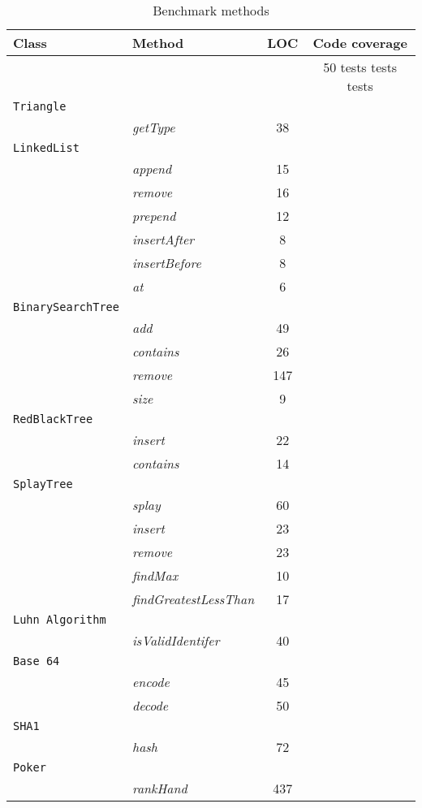 \begin{table}[h]
\centering
\begin{tabular}{|l|l|c|c|}
\hline
\textbf{Class} & \textbf{Method} & \textbf{LOC} & \textbf{Code coverage} \\
\hline
 & & & 50 tests \vline 100 tests \vline 1000 tests \\
\hline
\texttt{Triangle} & & \\
           & \textit{getType} & 38      \\
\hline
\texttt{LinkedList} & & \\
           & \textit{append} & 15       \\
           & \textit{remove} & 16       \\
           & \textit{prepend} & 12      \\
           & \textit{insertAfter} & 8   \\
           & \textit{insertBefore} & 8  \\
           & \textit{at} & 6            \\
\hline
\texttt{BinarySearchTree} & &     \\
           & \emph{add} & 49      \\
           & \emph{contains} & 26 \\
           & \emph{remove} & 147  \\
           & \emph{size} & 9      \\
\hline
\texttt{RedBlackTree} & &         \\
           & \emph{insert} & 22   \\
           & \emph{contains} & 14 \\
\hline
\texttt{SplayTree} & &             \\
           & \emph{splay} & 60 \\
           & \emph{insert} & 23 \\
           & \emph{remove} & 23 \\
           & \emph{findMax} & 10 \\
           & \emph{findGreatestLessThan} & 17 \\
\hline
\texttt{Luhn Algorithm} & &     \\
           & \emph{isValidIdentifer} & 40 \\
\hline
\texttt{Base 64} & &     \\
           & \emph{encode} & 45 \\
           & \emph{decode} & 50 \\
\hline
\texttt{SHA1} & &             \\
           & \emph{hash} & 72 \\
\hline
\texttt{Poker} & &                 \\
           & \emph{rankHand} & 437 \\
\hline
\end{tabular}
\caption{Benchmark methods}
\label{benchmarktests}
\end{table}



